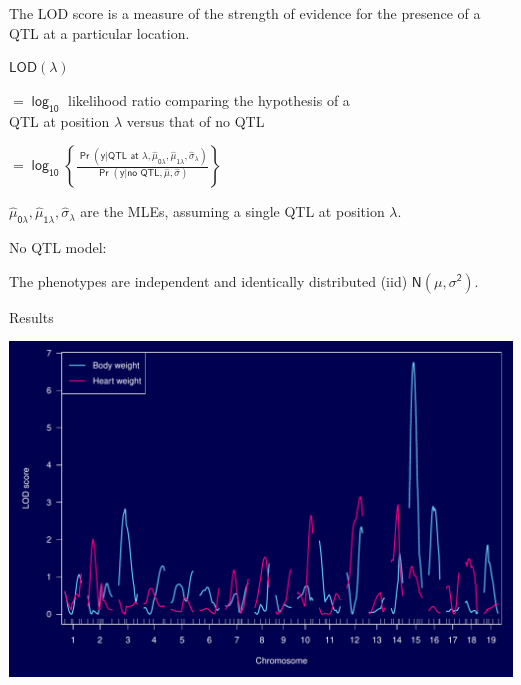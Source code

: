 \documentclass[12pt]{article}
\newcommand{\headsize}{\fontsize{35}{35} \selectfont}
\newcommand{\smallersize}{\fontsize{20}{25} \selectfont}
\newcommand{\lod}{\text{LOD}}
\begin{document}
\hfill
\begin{minipage}{10in}
\color{mywhite} \smallersize
 The LOD score is a measure of the {\color{mypink} strength of
evidence} for the presence of a QTL at a particular
location.
\vspace{15mm}

 $\mathsf{\lod(\lambda)}$
\begin{minipage}[t]{8.5in}
$\mathsf{= \log_{10}}$ likelihood ratio comparing the hypothesis of a \\
\hspace*{8mm} QTL at position $\mathsf{\lambda}$ versus that of no QTL
\vspace{5mm}

\headsize
$\mathsf{= \log_{10} \left\{ \frac{\Pr(y | \text{QTL at $\lambda$}, \hat{\mu}_{0\lambda},
\hat{\mu}_{1\lambda}, \hat{\sigma}_\lambda)}{\Pr(y | \text{no QTL}, \hat{\mu},
\hat{\sigma})} \right\}}$
\end{minipage}
\vspace{15mm}

 $\mathsf{\hat{\mu}_{0\lambda}, \hat{\mu}_{1\lambda}, \hat{\sigma}_\lambda}$ are the MLEs,
assuming a single QTL at position $\mathsf{\lambda}$.
\vspace{15mm}

 No QTL model:
\begin{minipage}[t]{7.5in}
The phenotypes are independent and identically
distributed (iid) $\mathsf{N(\mu, \sigma^2)}$.
\end{minipage}
\end{minipage}



\newpage

\headsize \color{myyellow}
\hfill \begin{minipage}{5.75in}
\centering
Results
\end{minipage}

\vspace{10mm}

\centerline{\includegraphics{Figs/alod.pdf}}
\end{document}
